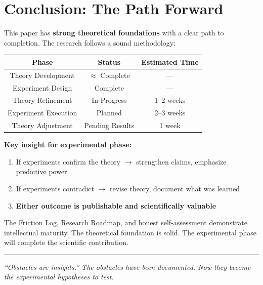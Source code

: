 \documentclass[11pt]{article}
\begin{document}
\section{Conclusion: The Path Forward}

This paper has \textbf{strong theoretical foundations} with a clear path to completion. The research follows a sound methodology:

\begin{center}
\begin{tabular}{|c|c|c|}
\hline
\textbf{Phase} & \textbf{Status} & \textbf{Estimated Time} \\
\hline
Theory Development & \textcolor{green!60!black}{$\approx$ Complete} & --- \\
Experiment Design & \textcolor{green!60!black}{Complete} & --- \\
Theory Refinement & \textcolor{orange!80!black}{In Progress} & 1--2 weeks \\
Experiment Execution & \textcolor{blue!70}{Planned} & 2--3 weeks \\
Theory Adjustment & \textcolor{blue!70}{Pending Results} & 1 week \\
\hline
\end{tabular}
\end{center}

\textbf{Key insight for experimental phase:}
\begin{enumerate}
    \item If experiments confirm the theory $\rightarrow$ strengthen claims, emphasize predictive power
    \item If experiments contradict $\rightarrow$ revise theory, document what was learned
    \item \textbf{Either outcome is publishable and scientifically valuable}
\end{enumerate}

The Friction Log, Research Roadmap, and honest self-assessment demonstrate intellectual maturity. The theoretical foundation is solid. The experimental phase will complete the scientific contribution.

\vspace{1cm}
\hrule
\vspace{0.5cm}
\textit{``Obstacles are insights.'' The obstacles have been documented. Now they become the experimental hypotheses to test.}
\end{document}
